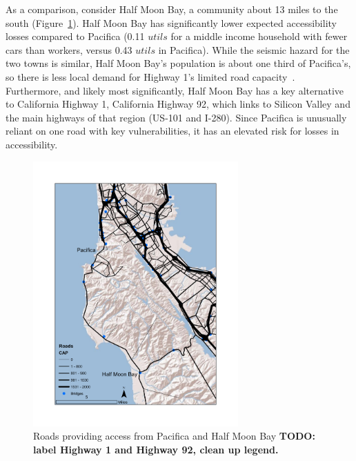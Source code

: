 As a comparison, consider Half Moon Bay, a community about 13 miles to the south (Figure~\ref{fig:pac}). Half Moon Bay has significantly lower expected accessibility losses compared to Pacifica (0.11 $utils$ for a middle income household with fewer cars than workers, versus 0.43 $utils$ in Pacifica). %
While the seismic hazard for the two towns is similar, Half Moon Bay's population is about one third of Pacifica's, so there is less local demand for Highway 1's limited road capacity~\cite{u.s._bureau_of_the_census_united_2010}. Furthermore, and likely most significantly, Half Moon Bay has a key alternative to California Highway 1, California Highway 92, which links to Silicon Valley and the main highways of that region (US-101 and I-280). %
Since Pacifica is unusually reliant on one road with key vulnerabilities, it has an elevated risk for losses in accessibility.
\begin{figure}[!ht]
    \centering
    \includegraphics[height=4in]{FIGS/equity_hmb.pdf} 
\caption{Roads providing access from Pacifica and Half Moon Bay \bf{TODO: label Highway 1 and Highway 92, clean up legend}.}
\label{fig:pac}
\end{figure}




